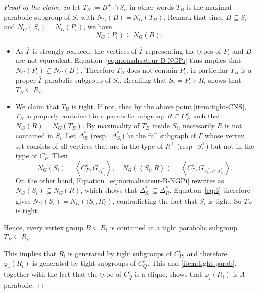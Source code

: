 \documentclass[10pt,a4paper]{amsart}
\begin{document}
\begin{proof}[Proof of the claim]
So let $T_B:=B^+\cap S_i$, in other words $T_B$ is the maximal parabolic subgroup of $S_i$ with $N_G(B)=N_G(T_B)$. Remark that since $B\subseteq S_i$ and $N_G(S_i)=N_G(P_i)$, we have 
\begin{equation}
    \label{eq:normalisateur-B-NGPi}
    N_G(P_i)\subseteq N_G(B).
\end{equation}
\begin{itemize}
    \item As $\overline{\Gamma}$ is strongly reduced, the vertices of $\overline{\Gamma}$ representing the types of $P_i$ and $B$ are not equivalent. Equation~\eqref{eq:normalisateur-B-NGPi} thus implies that $N_G(P_i)\subsetneq N_G(B)$.
    Therefore $T_B$ does not contain $P_i$, in particular $T_B$ is a proper $\overline{\Gamma}$-parabolic subgroup of $S_i$.
    Recalling that $S_i=P_i\times R_i$ shows that $T_B\subseteq R_i$. 
    \item We claim that $T_B$ is tight. If not, then by the above point \ref{item:tight-CNS}, $T_B$ is properly contained in a parabolic subgroup $R\subseteq C_P^e$ such that $N_G(R)=N_G(T_B)$. By maximality of $T_B$ inside $S_i$, necessarily $R$ is not contained in $S_i$. Let $\Delta_R^*$ (resp.\ $\Delta_{S_i}^*$) be the full subgraph of $\overline{\Gamma}$ whose vertex set consists of all vertices that are in the type of $R^\perp$ (resp.\ $S_i^\perp$) but not in the type of $C_P^e$. Then 
\begin{equation}\label{eq:3}
    N_G(S_i)=\left\langle { C_P^e, G_{\Delta_{S_i}^*} }\right\rangle, 
    \quad N_G\left( \left\langle{S_i,R}\right\rangle \right)=\left\langle {C_P^e, G_{\Delta_R^*\cap \Delta_{S_i}^*} } \right\rangle.
\end{equation}
On the other hand, Equation~\eqref{eq:normalisateur-B-NGPi} rewrites as $N_G(S_i)\subseteq N_G(R)$, which shows that $\Delta_{S_i}^*\subseteq \Delta_R^*$. Equation~\eqref{eq:3} therefore gives $N_G(S_i)=N_G(\langle S_i,R\rangle)$, contradicting the fact that $S_i$ is tight. So $T_B$ is tight.
\end{itemize}
Hence, every vertex group $B\subseteq R_i$ is contained in a tight parabolic subgroup $T_B\subseteq R_i$. 

This implies that $R_i$ is generated by tight subgroups of $C_P^e$, and therefore $\varphi_i(R_i)$ is generated by tight subgroups of $C_Q^e$. This and \ref{item:tight-parab}, together with the fact that the type of $C_Q^e$ is a clique, shows that $\varphi_i(R_i)$ is $\overline{\Lambda}$-parabolic.
\end{proof}
\end{document}
